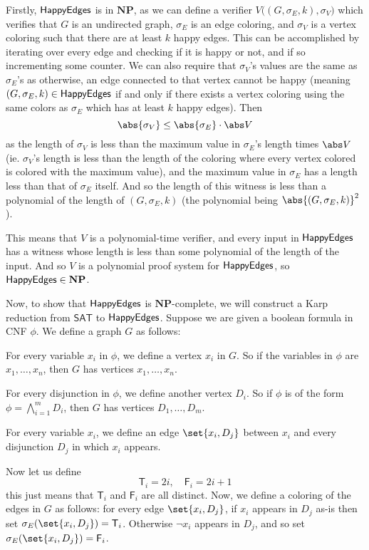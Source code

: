 \documentclass[10pt]{article}
\def\sat{\mathsf{SAT}}
\def\NP{\mathbf{NP}}
\begin{document}
Firstly, $\mathsf{HappyEdges}$ is in $\NP$, as we can define a verifier $V\bigl((G,\sigma_E,k),\sigma_V\bigr)$ which verifies that $G$ is an undirected graph, $\sigma_E$ is an edge coloring, and $\sigma_V$
is a vertex coloring such that there are at least $k$ happy edges.
This can be accomplished by iterating over every edge and checking if it is happy or not, and if so incrementing some counter.
We can also require that $\sigma_V$'s values are the same as $\sigma_E$'s as otherwise, an edge connected to that vertex cannot be happy (meaning $(G,\sigma_E,k)\in\mathsf{HappyEdges}$ if and only if there exists
a vertex coloring using the same colors as $\sigma_E$ which has at least $k$ happy edges).
Then
\[ \abs{\sigma_V} \leq \abs{\sigma_E}\cdot\abs V \]
as the length of $\sigma_V$ is less than the maximum value in $\sigma_E$'s length times $\abs V$ (ie. $\sigma_V$'s length is less than the length of the coloring where every vertex colored is colored with
the maximum value), and the maximum value in $\sigma_E$ has a length less than that of $\sigma_E$ itself.
And so the length of this witness is less than a polynomial of the length of $(G,\sigma_E,k)$ (the polynomial being $\abs{(G,\sigma_E,k)}^2$).

This means that $V$ is a polynomial-time verifier, and every input in $\mathsf{HappyEdges}$ has a witness whose length is less than some polynomial of the length of the input.
And so $V$ is a polynomial proof system for $\mathsf{HappyEdges}$, so $\happyedges\in\NP$.

Now, to show that $\mathsf{HappyEdges}$ is $\NP$-complete, we will construct a Karp reduction from $\sat$ to $\mathsf{HappyEdges}$.
Suppose we are given a boolean formula in CNF $\phi$.
We define a graph $G$ as follows:
\benum
    \item For every variable $x_i$ in $\phi$, we define a vertex $x_i$ in $G$.
    So if the variables in $\phi$ are $x_1,\dots,x_n$, then $G$ has vertices $x_1,\dots,x_n$.
    \item For every disjunction in $\phi$, we define another vertex $D_i$.
    So if $\phi$ is of the form $\phi=\bigwedge_{i=1}^m D_i$, then $G$ has vertices $D_1,\dots,D_m$.
    \item For every variable $x_i$, we define an edge $\set{x_i,D_j}$ between $x_i$ and every disjunction $D_j$ in which $x_i$ appears.
\eenum

\def\T{\mathsf{T}} \def\F{\mathsf{F}}
Now let us define
\[ \T_i = 2i,\quad \F_i = 2i+1 \]
this just means that $\T_i$ and $\F_i$ are all distinct.
Now, we define a coloring of the edges in $G$ as follows: for every edge $\set{x_i,D_j}$, if $x_i$ appears in $D_j$ as-is then set $\sigma_E(\set{x_i,D_j})=\T_i$.
Otherwise $\neg x_i$ appears in $D_j$, and so set $\sigma_E(\set{x_i,D_j})=\F_i$.
\end{document}
